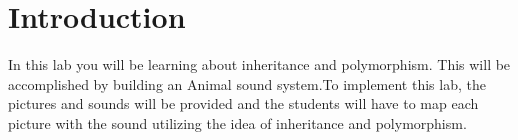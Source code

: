\section{Introduction}

In this lab you will be learning about inheritance and polymorphism. This will be accomplished by building an Animal sound system.To implement this lab, the pictures and sounds will be provided and the students will have to map each picture with the sound utilizing the idea of inheritance and polymorphism. 

 

